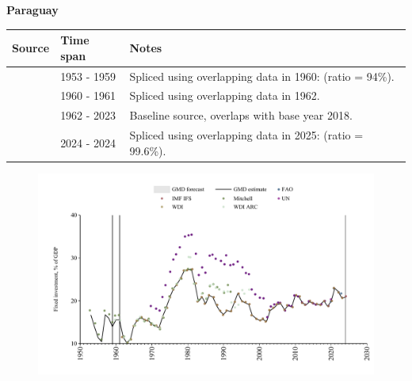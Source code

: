 \documentclass[12pt,a4paper,landscape]{article}
\begin{document}
\begin{adjustbox}{max totalsize={\paperwidth}{\paperheight},center}
\begin{minipage}[t][\textheight][t]{\textwidth}
\vspace*{0.5cm}
{}
\begin{center}
{\Large\bfseries Paraguay}
\end{center}
\vspace{0.5cm}
\begin{table}[H]
\centering
\small
\begin{tabular}{|l|l|l|}
\hline
\textbf{Source} & \textbf{Time span} & \textbf{Notes} \\
\hline
\rowcolor{white}\cite{Mitchell}& 1953 - 1959 &Spliced using overlapping data in 1960: (ratio = 94\%).\\
\rowcolor{lightgray}\cite{WDI_ARC}& 1960 - 1961 &Spliced using overlapping data in 1962.\\
\rowcolor{white}\cite{WDI}& 1962 - 2023 &Baseline source, overlaps with base year 2018.\\
\rowcolor{lightgray}\cite{IMF_IFS}& 2024 - 2024 &Spliced using overlapping data in 2025: (ratio = 99.6\%).\\
\hline
\end{tabular}
\end{table}
\begin{figure}[H]
\centering
\includegraphics[width=\textwidth,height=0.6\textheight,keepaspectratio]{graphs/PRY_finv_GDP.pdf}
\end{figure}
\end{minipage}
\end{adjustbox}
\end{document}
